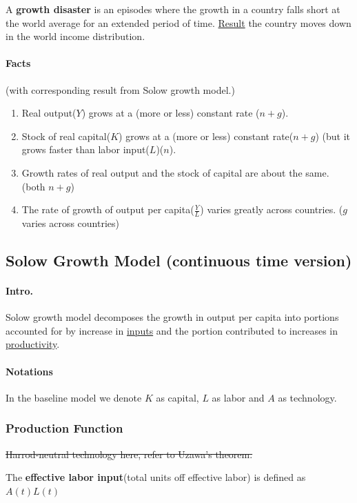 \documentclass[11pt]{article}
\begin{document}
        \begin{definition}
            A \textbf{growth disaster} is an episodes where the growth in a country falls short at the world average for an extended period of time. \ul{Result} the country moves down in the world income distribution.
        \end{definition}
    
        \paragraph{Facts}(with corresponding result from Solow growth model.)
        \begin{enumerate}
            \item Real output($Y$) grows at a (more or less) constant rate ($n+g$).
            \item Stock of real capital($K$) grows at a (more or less) constant rate($n+g$) (but it grows faster than labor input($L$)($n$).
            \item Growth rates of real output and the stock of capital are about the same. (both $n+g$)
            \item The rate of growth of output per capita($\frac{Y}{L}$) varies greatly across countries. ($g$ varies across countries)
        \end{enumerate}
        
        \subsection{Solow Growth Model (continuous time version)}
            \paragraph{Intro.} Solow growth model decomposes the growth in output per capita into portions accounted for by increase in \ul{inputs} and the portion contributed to increases in \ul{productivity}.
           
            \paragraph{Notations} In the baseline model we denote $K$ as capital, $L$ as labor and $A$ as technology.
            
        \subsubsection{Production Function}
            \begin{remark}
                \st{Harrod-neutral technology here, refer to Uzawa's theorem.}
            \end{remark}
            \begin{definition}
                The \textbf{effective labor input}(total units off effective labor) is defined as $A(t)L(t)$
            \end{definition}
            
\end{document}
